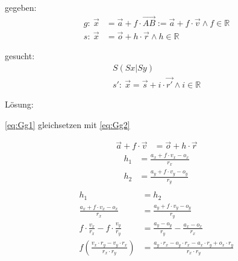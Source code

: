 \documentclass[reducespace,stylepage,semiarbeit]{spezidoc}
\begin{document}
gegeben:
\begin{subequations} 
\begin{align}
g:~ \vec{x} &= \vec{a} + f \cdot \vec{AB} := \vec{a} + f \cdot \vec{v} \wedge f \in \mathds{R} \label{eq:Gg1} \\ 
s:~ \vec{x} &= \vec{o} + h \cdot \vec{r} \wedge h \in \mathds{R} \label{eq:Gg2}
\end{align}
\end{subequations}

gesucht:
\begin{subequations}
\begin{align}
S(Sx|Sy)~~~~~~~~~ \nonumber \\
s':~ \vec{x} = \vec{s} + i \cdot \vec{r'} \wedge i \in \mathds{R} \nonumber
\end{align}
\end{subequations}

\newpage
Lösung:
\begin{center}
\ref{eq:Gg1} gleichsetzen mit \ref{eq:Gg2}
\end{center}
\begin{equation*}
\begin{split} 
\vec{a} + f \cdot \vec{v} &= \vec{o} + h \cdot \vec{r}
\end{split}
\end{equation*}
\begin{equation*}
\begin{split}
h_1 &= \frac{a_x + f \cdot v_x - o_x}{r_x} \\
h_2 &= \frac{a_y + f \cdot v_y - o_y}{r_y} \\
\end{split}
\end{equation*}
\begin{equation*}
\begin{split}
h_1 &= h_2 \\
\frac{a_x + f \cdot v_x - o_x}{r_x} &= \frac{a_y + f \cdot v_y - o_y}{r_y} \\
f \cdot \frac{v_x}{r_x} - f \cdot \frac{v_y}{r_y} &= \frac{a_y - o_y}{r_y} - \frac{a_x - o_x}{r_x} \\
f(\frac{v_x \cdot r_y - v_y \cdot r_x}{r_x \cdot r_y}) &= \frac{a_y \cdot r_x - o_y \cdot r_x - a_x \cdot r_y + o_x \cdot r_y}{r_x \cdot r_y} 
\end{split}
\end{equation*}
\end{document}
